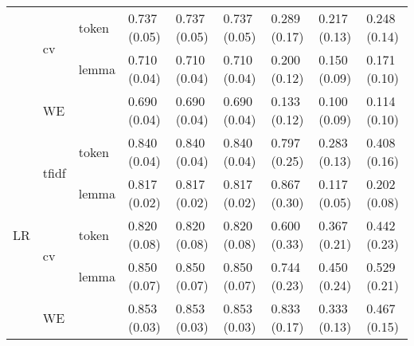 \begin{tabular}{lllllllll}
 & \multirow[c]{2}{*}{cv} & token & 0.737 (0.05) & 0.737 (0.05) & 0.737 (0.05) & 0.289 (0.17) & 0.217 (0.13) & 0.248 (0.14) \\
 &  & lemma & 0.710 (0.04) & 0.710 (0.04) & 0.710 (0.04) & 0.200 (0.12) & 0.150 (0.09) & 0.171 (0.10) \\
 & WE &  & 0.690 (0.04) & 0.690 (0.04) & 0.690 (0.04) & 0.133 (0.12) & 0.100 (0.09) & 0.114 (0.10) \\
\multirow[c]{5}{*}{LR} & \multirow[c]{2}{*}{tfidf} & token & 0.840 (0.04) & 0.840 (0.04) & 0.840 (0.04) & 0.797 (0.25) & 0.283 (0.13) & 0.408 (0.16) \\
 &  & lemma & 0.817 (0.02) & 0.817 (0.02) & 0.817 (0.02) & 0.867 (0.30) & 0.117 (0.05) & 0.202 (0.08) \\
 & \multirow[c]{2}{*}{cv} & token & 0.820 (0.08) & 0.820 (0.08) & 0.820 (0.08) & 0.600 (0.33) & 0.367 (0.21) & 0.442 (0.23) \\
 &  & lemma & 0.850 (0.07) & 0.850 (0.07) & 0.850 (0.07) & 0.744 (0.23) & 0.450 (0.24) & 0.529 (0.21) \\
 & WE &  & 0.853 (0.03) & 0.853 (0.03) & 0.853 (0.03) & 0.833 (0.17) & 0.333 (0.13) & 0.467 (0.15) \\
\end{tabular}
